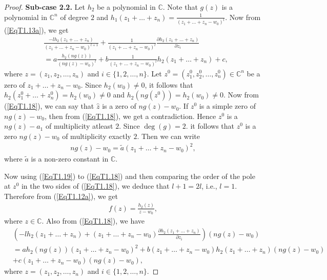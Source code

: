 \documentclass[11pt,reqno]{amsart}
\numberwithin{equation}{section}
\begin{document}
\begin{proof}
\medskip
{\bf Sub-case 2.2.} Let $h_2$ be a polynomial in $\mathbb{C}$. Note that $g(z)$ is a polynomial in $\mathbb{C}^n$ of degree $2$ and $h_1(z_1+\ldots+z_n)=\frac{1}{(z_1+\ldots+z_n-w_0)^l}$. Now from (\ref{EqT1.13a}), we get
\begin{align}\label{EqT1.18}
&\frac{-lh_2(z_1+\ldots+z_n)}{(z_1+\ldots+z_n-w_0)^{l+1}}+\frac{1}{(z_1+\ldots+z_n-w_0)^l}\frac{\partial h_2(z_1+\ldots+z_n)}{\partial z_i}\\&=a\frac{h_2(ng(z))}{(ng(z)-w_0)^l}+b\frac{1}{(z_1+\ldots+z_n-w_0)^l}h_2(z_1+\ldots+z_n)+c,\nonumber
\end{align}
where $z=(z_1,z_2,\ldots,z_n)$ and $i\in\{1,2,\ldots,n\}$. Let $z^0=(z^0_1,z^0_2,\ldots,z^0_n)\in\mathbb{C}^n$ be a zero of $z_1+\ldots+z_n-w_0$. Since $h_2(w_0)\neq 0$, it follows that $h_2(z^0_1+\ldots+z^0_n)=h_2(w_0)\neq 0$ and $h_2(ng(z^0))=h_2(w_0)\neq 0$.
Now from (\ref{EqT1.18}), we can say that $\hat z$ is a zero of $ng(z)-w_0$. If $z^0$ is a simple zero of $ng(z)-w_0$, then from (\ref{EqT1.18}), we get a contradiction. Hence $z^0$ is a $ng(z)-a_1$ of multiplicity atleast $2$. Since $\deg(g)=2$. it follows that $z^0$ is a zero $ng(z)-w_0$ of multiplicity exactly $2$. Then we can write 
\begin{align}\label{EqT1.19}
ng(z)-w_0=\tilde a\left(z_1+\ldots+z_n-w_0\right)^2,
\end{align}
where $\tilde a$ is a non-zero constant in $\mathbb{C}$.

Now using (\ref{EqT1.19}) to (\ref{EqT1.18}) and then comparing the order of the pole at $z^0$ in the two sides of (\ref{EqT1.18}), we deduce that $l+1=2l$, i.e., $l=1$. Therefore from (\ref{EqT1.12a}), we get
\begin{align}\label{EqT1.19a}
f(z)=\frac{h_2(z)}{z-w_0},
\end{align}
where $z\in\mathbb{C}$. Also from (\ref{EqT1.18}), we have
\begin{align}\label{EqT1.20}
&\left(-lh_2(z_1+\ldots+z_n)+(z_1+\ldots+z_n-w_0)\frac{\partial h_2(z_1+\ldots+z_n)}{\partial z_i}\right)(ng(z)-w_0)\\&=ah_2(ng(z))(z_1+\ldots+z_n-w_0)^2+b(z_1+\ldots+z_n-w_0)h_2(z_1+\ldots+z_n)(ng(z)-w_0)\nonumber\\&+c(z_1+\ldots+z_n-w_0)(ng(z)-w_0),\nonumber
\end{align}
where $z=(z_1,z_2,\ldots,z_n)$ and $i\in\{1,2,\ldots,n\}$. 


\end{proof}
\end{document}
